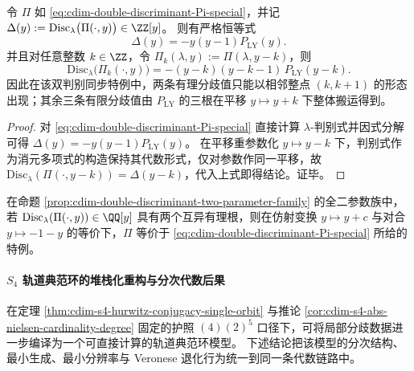 \begin{proposition}[判别式核的因式分解与整数平移闭包]\label{prop:cdim-double-discriminant-integer-translate-rigidity}
令 \(\Pi\) 如 \eqref{eq:cdim-double-discriminant-Pi-special}，并记
\(
\Delta(y):=\mathrm{Disc}_{\lambda}\bigl(\Pi(\cdot,y)\bigr)\in\ZZ[y]
\)。
则有严格恒等式
\[
\Delta(y)=-y(y-1)P_{\mathrm{LY}}(y).
\]
并且对任意整数 \(k\in\ZZ\)，令 \(\Pi_k(\lambda,y):=\Pi(\lambda,y-k)\)，则
\[
\mathrm{Disc}_{\lambda}\bigl(\Pi_k(\cdot,y)\bigr)
=-(y-k)(y-k-1)\,P_{\mathrm{LY}}(y-k).
\]
因此在该双判别同步特例中，两条有理分歧值只能以相邻整点 \((k,k+1)\) 的形态出现；其余三条有限分歧值由 \(P_{\mathrm{LY}}\) 的三根在平移 \(y\mapsto y+k\) 下整体搬运得到。
\end{proposition}
\begin{proof}
对 \eqref{eq:cdim-double-discriminant-Pi-special} 直接计算 \(\lambda\)-判别式并因式分解可得 \(\Delta(y)=-y(y-1)P_{\mathrm{LY}}(y)\)。
在平移重参数化 \(y\mapsto y-k\) 下，判别式作为消元多项式的构造保持其代数形式，仅对参数作同一平移，故
\(
\mathrm{Disc}_{\lambda}(\Pi(\cdot,y-k))=\Delta(y-k)
\)，代入上式即得结论。证毕。
\end{proof}

\begin{conjecture}[双判别同步族的有理分歧极小性]\label{conj:cdim-double-discriminant-rational-branch-minimality}
在命题 \ref{prop:cdim-double-discriminant-two-parameter-family} 的全二参数族中，若 \(\mathrm{Disc}_{\lambda}(\Pi(\cdot,y))\in\QQ[y]\) 具有两个互异有理根，则在仿射变换 \(y\mapsto y+c\) 与对合 \(y\mapsto-1-y\) 的等价下，\(\Pi\) 等价于 \eqref{eq:cdim-double-discriminant-Pi-special} 所给的特例。
\end{conjecture}

\paragraph{\texorpdfstring{$S_4$}{S4} 轨道典范环的堆栈化重构与分次代数后果}
在定理 \ref{thm:cdim-s4-hurwitz-conjugacy-single-orbit} 与推论 \ref{cor:cdim-s4-abs-nielsen-cardinality-degree} 固定的护照
\((4)(2)^5\)
口径下，可将局部分歧数据进一步编译为一个可直接计算的轨道典范环模型。
下述结论把该模型的分次结构、最小生成、最小分辨率与 Veronese 退化行为统一到同一条代数链路中。


